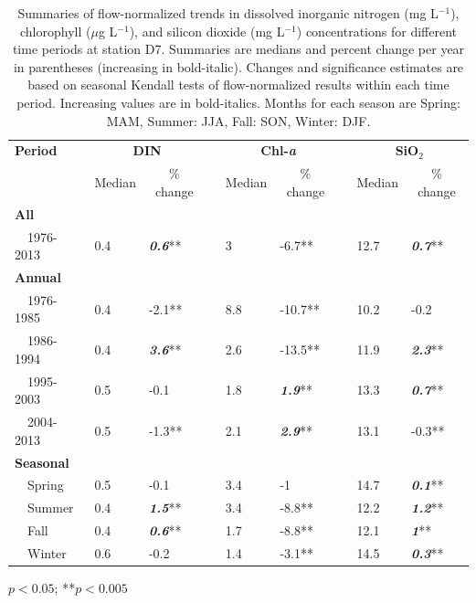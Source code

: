 \documentclass[journal = esthag, manuscript = article]{achemso}\usepackage[]{graphicx}\usepackage[]{color}
\begin{document}
\begin{table}[!tbp]
\caption{Summaries of flow-normalized trends in dissolved inorganic nitrogen (mg L$^{-1}$), chlorophyll ($\mu$g L$^{-1}$), and silicon dioxide (mg L$^{-1}$) concentrations for different time periods at station D7. Summaries are  medians and percent change per year in parentheses (increasing in bold-italic).  Changes and significance estimates are based on seasonal Kendall tests of flow-normalized results within each time period. Increasing values are in bold-italics. Months for each season are Spring: MAM, Summer: JJA, Fall: SON, Winter: DJF.\label{tab:d7chg}} 
\begin{center}
\begin{tabular}{lllcllcll}
\hline\hline
\multicolumn{1}{l}{\bfseries Period}&\multicolumn{2}{c}{\bfseries DIN}&\multicolumn{1}{c}{\bfseries }&\multicolumn{2}{c}{\bfseries Chl-\textit{a}}&\multicolumn{1}{c}{\bfseries }&\multicolumn{2}{c}{\bfseries SiO$_2$}\tabularnewline
\cline{2-3} \cline{5-6} \cline{8-9}
\multicolumn{1}{l}{}&\multicolumn{1}{c}{Median}&\multicolumn{1}{c}{\% change}&\multicolumn{1}{c}{}&\multicolumn{1}{c}{Median}&\multicolumn{1}{c}{\% change}&\multicolumn{1}{c}{}&\multicolumn{1}{c}{Median}&\multicolumn{1}{c}{\% change}\tabularnewline
\hline
{\bfseries All}&&&&&&&&\tabularnewline
~~1976-2013&0.4&\textit{\textbf{0.6}}**&&3&-6.7**&&12.7&\textit{\textbf{0.7}}**\tabularnewline
\hline
{\bfseries Annual}&&&&&&&&\tabularnewline
~~1976-1985&0.4&-2.1**&&8.8&-10.7**&&10.2&-0.2\tabularnewline
~~1986-1994&0.4&\textit{\textbf{3.6}}**&&2.6&-13.5**&&11.9&\textit{\textbf{2.3}}**\tabularnewline
~~1995-2003&0.5&-0.1&&1.8&\textit{\textbf{1.9}}**&&13.3&\textit{\textbf{0.7}}**\tabularnewline
~~2004-2013&0.5&-1.3**&&2.1&\textit{\textbf{2.9}}**&&13.1&-0.3**\tabularnewline
\hline
{\bfseries Seasonal}&&&&&&&&\tabularnewline
~~Spring&0.5&-0.1&&3.4&-1&&14.7&\textit{\textbf{0.1}}**\tabularnewline
~~Summer&0.4&\textit{\textbf{1.5}}**&&3.4&-8.8**&&12.2&\textit{\textbf{1.2}}**\tabularnewline
~~Fall&0.4&\textit{\textbf{0.6}}**&&1.7&-8.8**&&12.1&\textit{\textbf{1}}**\tabularnewline
~~Winter&0.6&-0.2&&1.4&-3.1**&&14.5&\textit{\textbf{0.3}}**\tabularnewline
\hline
\end{tabular}\end{center}

\footnotesize *$p<0.05$; **$p<0.005$\end{table}
\end{document}

